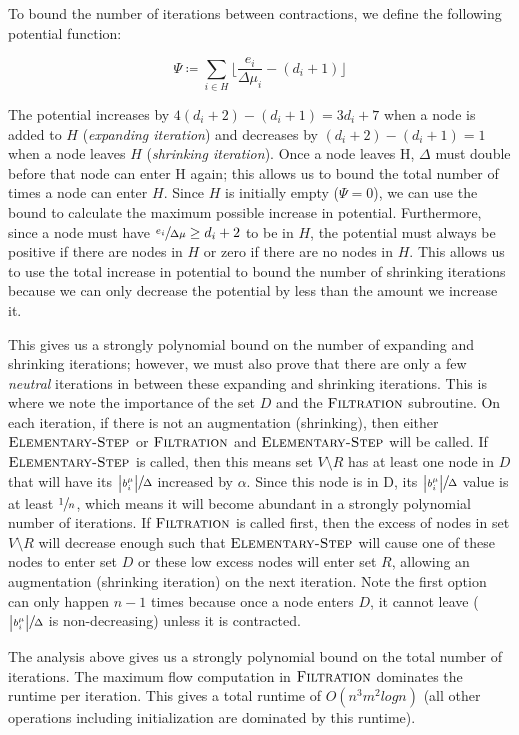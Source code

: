 \documentclass[11pt]{article}
\theoremstyle{definition}
\theoremstyle{definition}
\theoremstyle{definition}
\newcommand{\filtration}{\textsc{Filtration}}
\newcommand{\es}{\textsc{Elementary-Step}}
\begin{document}
To bound the number of iterations between contractions, we define the following potential function: 

\[ \Psi \coloneqq \sum_{i \in H}  \lfloor \frac{e_i}{\Delta \mu_i} - (d_i + 1) \rfloor \]

The potential increases by $4(d_i + 2) - (d_i + 1) = 3d_i + 7$ when a node is
added to $H$ (\textit{expanding iteration}) and decreases by $(d_i + 2) - (d_i + 1) = 1$
when a node leaves $H$ (\textit{shrinking iteration}). Once a node leaves
H, $\Delta$ must double before that node can enter H again; this allows us to
bound the total number of times a node can enter $H$. Since $H$ is initially empty
($\Psi = 0$), we can use the bound to calculate the maximum possible increase in
potential. Furthermore, since a node must have $\sfrac{e_i}{\Delta\mu} \geq d_i + 2$
to be in $H$, the potential must always be positive if there are nodes in $H$ or zero if there are no nodes in $H$. This allows us to use the
total increase in potential to bound the number of shrinking iterations because
we can only decrease the potential by less than the amount we increase it.

This gives us a strongly polynomial bound on the number of expanding and
shrinking iterations; however, we must also prove that there are only a few
\textit{neutral} iterations in between these expanding and shrinking iterations.
This is where we note the importance of the set $D$ and the $\filtration$
subroutine. On each iteration, if there is not an augmentation (shrinking), then
either $\es$ or $\filtration$ and $\es$ will be called. If $\es$ is called, then
this means set $V \setminus R$ has at least one node in $D$ that will have its
$\sfrac{\abs{b_i^\mu}}{\Delta}$ increased by $\alpha$. Since this node is in D,
its $\sfrac{\abs{b_i^\mu}}{\Delta}$ value is at least $\sfrac{1}{n}$, which means
it will become abundant in a strongly polynomial number of iterations. If
$\filtration$ is called first, then the excess of nodes in set $V \setminus R$
will decrease enough such that $\es$ will cause one of these nodes to enter set
$D$ or these low excess nodes will enter set $R$, allowing an augmentation
(shrinking iteration) on the next iteration. Note the first option can only
happen $n-1$ times because once a node enters $D$, it cannot leave
($\sfrac{\abs{b_i^\mu}}{\Delta}$ is non-decreasing) unless it is contracted.

The analysis above gives us a strongly polynomial bound on the total number of iterations. The maximum flow computation in $\filtration$ dominates the runtime per iteration. This gives a total runtime of $O(n^3m^2logn)$ (all other operations including initialization are dominated by this runtime).
\end{document}
